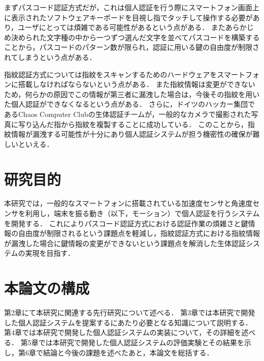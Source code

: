 まずパスコード認証方式だが，これは個人認証を行う際にスマートフォン画面上に表示されたソフトウェアキーボードを目視し指でタッチして操作する必要があり，ユーザにとっては煩雑である可能性があるという点がある．
またあらかじめ決められた文字種の中から一つずつ選んだ文字を並べてパスコードを構築することから，パスコードのパターン数が限られ，認証に用いる鍵の自由度が制限されてしまうという点がある．

指紋認証方式については指紋をスキャンするためのハードウェアをスマートフォンに搭載しなければならないという点がある．
また指紋情報は変更ができないため，何らかの原因でこの情報が第三者に漏洩した場合は，今後その指紋を用いた個人認証ができなくなるという点がある．
さらに，ドイツのハッカー集団であるChaos Computer Clubの生体認証チームが，一般的なカメラで撮影された写真に写り込んだ指から指紋を複製することに成功している\cite{1-ccc}．
このことから，指紋情報が漏洩する可能性が十分にあり個人認証システムが担う機密性の確保が難しいといえる\cite{1-sophos}．

\section{研究目的}
本研究では，一般的なスマートフォンに搭載されている加速度センサと角速度センサを利用し，端末を振る動き（以下，モーション）で個人認証を行うシステムを開発する．
これによりパスコード認証方式における認証作業の煩雑さと鍵情報の自由度が制限されるという課題点を軽減し，指紋認証方式における指紋情報が漏洩した場合に鍵情報の変更ができないという課題点を解消した生体認証システムの実現を目指す．

\section{本論文の構成}
第2章にて本研究に関連する先行研究について述べる．
第3章では本研究で開発した個人認証システムを提案するにあたり必要となる知識について説明する．
第4章では本研究で開発した個人認証システムの実装について，その詳細を述べる．
第5章では本研究で開発した個人認証システムの評価実験とその結果を示し，第6章で結論と今後の課題を述べたあと，本論文を総括する．
